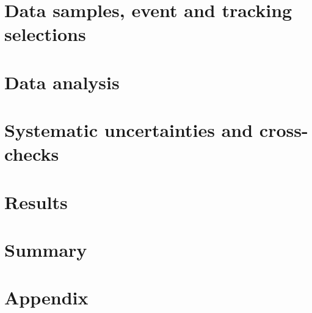 \documentclass[english]{atlasnote}
\begin{document}
\section{Data samples, event and tracking selections}
\label{sec:evtSlc}

\clearpage

\section{Data analysis}
\label{sec:ana}

\clearpage

\section{Systematic uncertainties and cross-checks}
\label{sec:sys}

\clearpage

\section{Results}
\label{sec:result}

\clearpage

\section{Summary}
\label{sec:summary}

\clearpage


\section{Appendix}
\label{sec:appdx}

\clearpage



\end{document}
